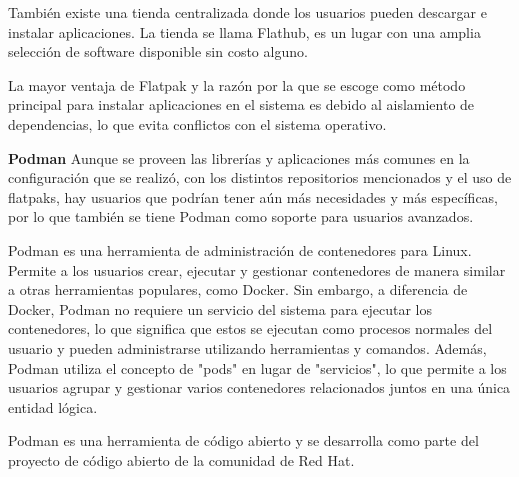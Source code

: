 \begin{doublespace}
\begin{multicols}{2}
    También existe una tienda centralizada donde los usuarios pueden descargar e instalar aplicaciones. La tienda se llama Flathub, es un lugar con una amplia selección de software disponible sin costo alguno.

    La mayor ventaja de Flatpak y la razón por la que se escoge como método principal para instalar aplicaciones en el sistema es debido al aislamiento de dependencias, lo que evita conflictos con el sistema operativo. \cite{FLAT-1} \cite{FLAT-2} \cite{RHEL-FLAT-1} \cite{PHOENIX-FLAT-1}

    \textbf{Podman}
    \newline
    Aunque se proveen las librerías y aplicaciones más comunes en la configuración que se realizó, con los distintos repositorios mencionados y el uso de flatpaks, hay usuarios que podrían tener aún más necesidades y más específicas, por lo que también se tiene Podman como soporte para usuarios avanzados.

    Podman es una herramienta de administración de contenedores para Linux. Permite a los usuarios crear, ejecutar y gestionar contenedores de manera similar a otras herramientas populares, como Docker. Sin embargo, a diferencia de Docker, Podman no requiere un servicio del sistema para ejecutar los contenedores, lo que significa que estos se ejecutan como procesos normales del usuario y pueden administrarse utilizando herramientas y comandos. Además, Podman utiliza el concepto de "pods" en lugar de "servicios", lo que permite a los usuarios agrupar y gestionar varios contenedores relacionados juntos en una única entidad lógica. 
    
    Podman es una herramienta de código abierto y se desarrolla como parte del proyecto de código abierto de la comunidad de Red Hat. \cite{RHEL-podman-1}

  \end{multicols}

  \mylinespacing
  \mylinespacing
  \begin{tightcenter}
  \end{tightcenter}
\end{doublespace}